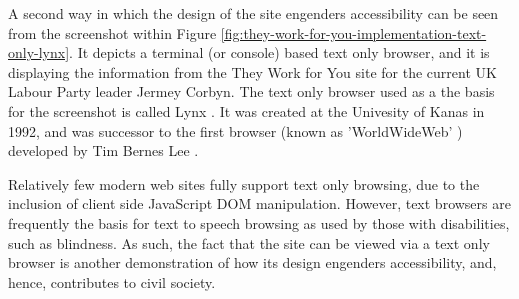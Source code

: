 A second way in which the design of the site engenders accessibility can be seen from the screenshot within Figure \ref{fig:they-work-for-you-implementation-text-only-lynx}.
It depicts a terminal (or console) based text only browser, and it is displaying the information from the They Work for You site for the current UK Labour Party leader Jermey Corbyn.
The text only browser used as a the basis for the screenshot is called Lynx \cite{lynx}.
It was created at the Univesity of Kanas in 1992, and was successor to the first browser (known as 'WorldWideWeb' \cite{browser-history}) developed by Tim Bernes Lee \cite{tim-berners-lee}.

Relatively few modern web sites fully support text only browsing, due to the inclusion of client side JavaScript DOM manipulation.
However, text browsers are frequently the basis for text to speech browsing as used by those with disabilities, such as blindness.
As such, the fact that the site can be viewed via a text only browser is another demonstration of how its design engenders accessibility, and, hence, contributes to civil society.
